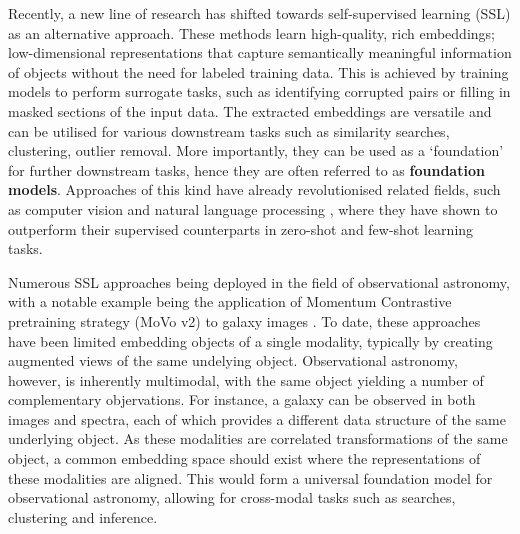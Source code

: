 \documentclass[a4paper,12pt]{article}
\begin{document}
Recently, a new line of research has shifted towards self-supervised learning (SSL) as an alternative approach. These methods learn high-quality, rich embeddings; low-dimensional representations that capture semantically meaningful information of objects without the need for labeled training data. This is achieved by training models to perform surrogate tasks, such as identifying corrupted pairs or filling in masked sections of the input data. The extracted embeddings are versatile and can be utilised for various downstream tasks such as similarity searches, clustering, outlier removal. More importantly, they can be used as a `foundation' for further downstream tasks, hence they are often referred to as \textbf{foundation models}.  Approaches of this kind have already revolutionised related fields, such as computer vision \cite{he2021maskedautoencodersscalablevision} and natural language processing \cite{radford2019language}, where they have shown to outperform their supervised counterparts in zero-shot and few-shot learning tasks.

Numerous SSL approaches being deployed in the field of observational astronomy, with a notable example being the application of Momentum Contrastive pretraining strategy (MoVo v2) to galaxy images \cite{stein}. To date, these approaches have been limited embedding objects of a single modality, typically by creating augmented views of the same undelying object. Observational astronomy, however, is inherently multimodal, with the same object yielding a number of complementary objervations. For instance, a galaxy can be observed in both images and spectra, each of which provides a different data structure of the same underlying object. As these modalities are correlated transformations of the same object, a common embedding space should exist where the representations of these modalities are aligned. This would form a universal foundation model for observational astronomy, allowing for cross-modal tasks such as searches, clustering and inference.
\end{document}
